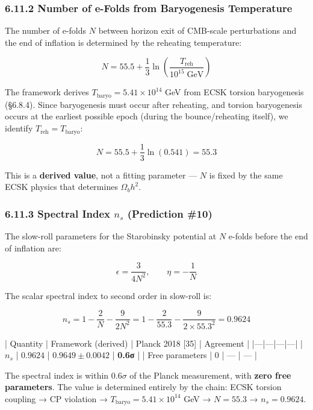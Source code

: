 \documentclass[11pt,a4paper]{article}
\theoremstyle{definition}
\theoremstyle{remark}
\begin{document}
\subsubsection{6.11.2 Number of e-Folds from Baryogenesis Temperature}

The number of e-folds $N$ between horizon exit of CMB-scale perturbations and the end of inflation is determined by the reheating temperature:


\begin{equation}
N = 55.5 + \frac{1}{3}\ln\!\left(\frac{T_{\text{reh}}}{10^{15}\;\text{GeV}}\right)
\end{equation}


The framework derives $T_{\text{baryo}} = 5.41 \times 10^{14}$ GeV from ECSK torsion baryogenesis (\S 6.8.4). Since baryogenesis must occur after reheating, and torsion baryogenesis occurs at the earliest possible epoch (during the bounce/reheating itself), we identify $T_{\text{reh}} = T_{\text{baryo}}$:


\begin{equation}
N = 55.5 + \frac{1}{3}\ln(0.541) = 55.3
\end{equation}


This is a \textbf{derived value}, not a fitting parameter — $N$ is fixed by the same ECSK physics that determines $\Omega_b h^2$.

\subsubsection{6.11.3 Spectral Index $n_s$ (Prediction \#10)}

The slow-roll parameters for the Starobinsky potential at $N$ e-folds before the end of inflation are:


\begin{equation}
\epsilon = \frac{3}{4N^2}, \qquad \eta = -\frac{1}{N}
\end{equation}


The scalar spectral index to second order in slow-roll is:


\begin{equation}
n_s = 1 - \frac{2}{N} - \frac{9}{2N^2} = 1 - \frac{2}{55.3} - \frac{9}{2 \times 55.3^2} = 0.9624
\end{equation}


| Quantity | Framework (derived) | Planck 2018 [35] | Agreement |
|---|---|---|---|
| $n_s$ | $0.9624$ | $0.9649 \pm 0.0042$ | \textbf{0.6σ} |
| Free parameters | 0 | — | — |

The spectral index is within $0.6\sigma$ of the Planck measurement, with \textbf{zero free parameters}. The value is determined entirely by the chain: ECSK torsion coupling → CP violation → $T_{\text{baryo}} = 5.41 \times 10^{14}$ GeV → $N = 55.3$ → $n_s = 0.9624$.
\end{document}
